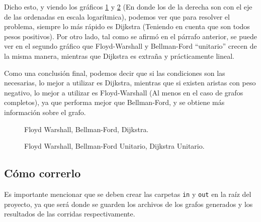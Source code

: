 \documentclass[a4paper,10pt]{article}
\begin{document}
	Dicho esto, y viendo los gráficos \ref{fig:fw-bf-d} y \ref{fig:fw-bfu-du} (En donde los de la derecha son con el eje de las ordenadas en escala logarítmica), podemos ver que para resolver el problema, siempre lo más rápido es Dijkstra (Teniendo en cuenta que son todos pesos positivos). Por otro lado, tal como se afirmó en el párrafo anterior, se puede ver en el segundo gráfico que Floyd-Warshall y Bellman-Ford ``unitario'' crecen de la misma manera, mientras que Dijkstra es extraña y prácticamente lineal.

	Como una conclusión final, podemos decir que si las condiciones son las necesarias, lo mejor a utilizar es Dijkstra, mientras que si existen aristas con peso negativo, lo mejor a utilizar es Floyd-Warshall (Al menos en el caso de grafos completos), ya que performa mejor que Bellman-Ford, y se obtiene más información sobre el grafo.

	\begin{figure}[!htb]
		\caption{Floyd Warshall, Bellman-Ford, Dijkstra.}
		\label{fig:fw-bf-d}
	\end{figure}

	\begin{figure}[!htb]
		\caption{Floyd Warshall, Bellman-Ford Unitario, Dijkstra Unitario.}
		\label{fig:fw-bfu-du}
	\end{figure}

\subsection{Cómo correrlo}
	Es importante mencionar que se deben crear las carpetas \texttt{in} y \texttt{out} en la raíz del proyecto, ya que será donde se guarden los archivos de los grafos generados y los resultados de las corridas respectivamente.
	
\end{document}
